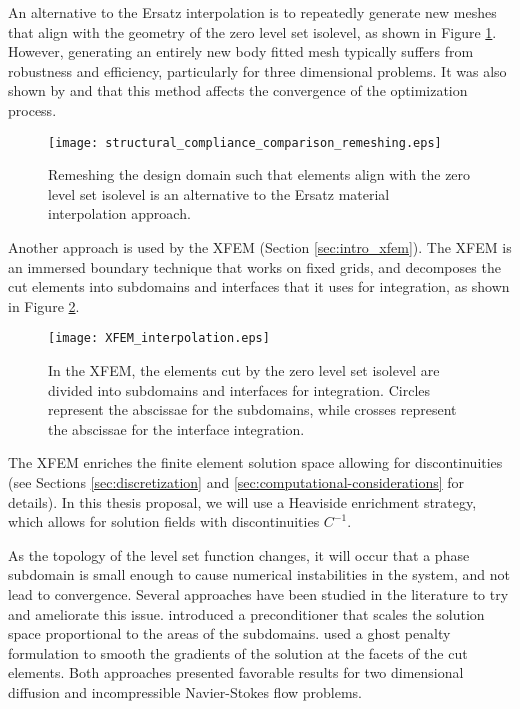 An alternative to the Ersatz interpolation is to repeatedly generate new meshes that align with the geometry of the zero level set isolevel, as shown in Figure \ref{fig:remeshing_interpolation}. However, generating an entirely new body fitted
mesh typically suffers from robustness and efficiency, particularly for three dimensional problems. It was also shown by \citep{SMR:00} and \citep{WKG:06} that this method affects the convergence of the optimization process.
%
\begin{figure}[H]
	\centering
	\texttt{[image: structural\_compliance\_comparison\_remeshing.eps]}
	\caption{Remeshing the design domain such that elements align with the zero level set isolevel is an alternative to the Ersatz material interpolation approach.}
	\label{fig:remeshing_interpolation}
\end{figure}

Another approach is used by the XFEM (Section \ref{sec:intro_xfem}). The XFEM is an immersed boundary technique that works on fixed grids, and decomposes the cut elements into subdomains and interfaces that it uses for integration, as shown in Figure \ref{fig:XFEM_interpolation}.
%
\begin{figure}[H]
	\centering
	\texttt{[image: XFEM\_interpolation.eps]}
	\caption{In the XFEM, the elements cut by the zero level set isolevel are divided into subdomains and interfaces for integration. Circles represent the abscissae for the subdomains, while crosses represent the abscissae for the interface integration.}
	\label{fig:XFEM_interpolation}
\end{figure}

The XFEM enriches the finite element solution space allowing for discontinuities (see Sections \ref{sec:discretization} and \ref{sec:computational-considerations} for details). In this thesis proposal, we will use a Heaviside enrichment strategy, which allows for solution fields with discontinuities $C^{-1}$.

As the topology of the level set function changes, it will occur that a phase subdomain is small enough to cause numerical instabilities in the system, and not lead to convergence. Several approaches have been studied in the literature to try and ameliorate this issue. \citep{LMD+:13} introduced a preconditioner that scales the solution space proportional to the areas of the subdomains. \citep{BH:12,SW:14,SRG+:14} used a ghost penalty formulation to smooth the gradients of the solution at the facets of the cut elements. Both approaches presented favorable results for two dimensional diffusion and incompressible Navier-Stokes flow problems.

